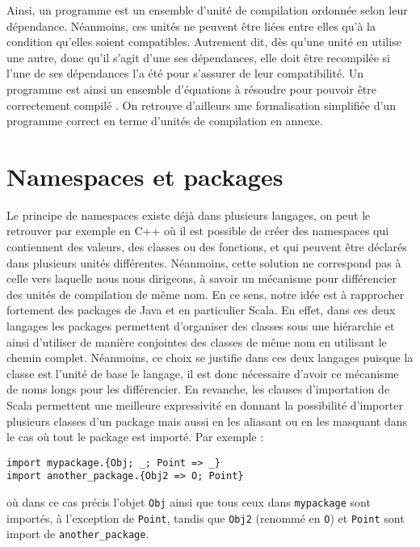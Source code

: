 \documentclass[11pt,a4paper]{report}
\begin{document}
Ainsi, un programme est un ensemble d'unité de compilation ordonnée selon leur
dépendance. Néanmoins, ces unités ne peuvent être liées entre elles qu'à la
condition qu'elles soient compatibles. Autrement dit, dès qu'une unité en
utilise une autre, donc qu'il s'agit d'une ses dépendances, elle doit être
recompilée si l'une de ses dépendances l'a été pour s'assurer de leur
compatibilité. Un programme est ainsi un ensemble d'équations à résoudre
pour pouvoir être correctement compilé \cite{Drossopoulou99afragment}. On
retrouve d'ailleurs une formalisation simplifiée d'un programme correct en terme
d'unités de compilation en annexe.

\section{Namespaces et packages}

Le principe de namespaces existe déjà dans plusieurs langages, on peut le
retrouver par exemple en C++\cite{cppspec} où il est possible de créer des
namespaces qui contiennent des valeurs, des classes ou des fonctions, et qui
peuvent être déclarés dans plusieurs unités différentes. Néanmoins, cette
solution ne correspond pas à celle vers laquelle nous nous dirigeons, à savoir
un mécanisme pour différencier des unités de compilation de même nom. En ce
sens, notre idée est à rapprocher fortement des packages de Java\cite{java-spec}
et en particulier Scala\cite{scalaspec}. En effet, dans ces deux langages les
packages permettent d'organiser des classes sous une hiérarchie et ainsi
d'utiliser de manière conjointes des classes de même nom en utilisant le chemin
complet. Néanmoins, ce choix se justifie dans ces deux langages puisque la 
classe est l'unité de base le langage, il est donc nécessaire d'avoir ce
mécanisme de noms longs pour les différencier. En revanche, les clauses
d'importation de Scala permettent une meilleure expressivité en donnant la
possibilité d'importer plusieurs classes d'un package mais aussi en les aliasant
ou en les masquant dans le cas où tout le package est importé. Par exemple :
\begin{verbatim}
import mypackage.{Obj; _; Point => _}
import another_package.{Obj2 => O; Point}
\end{verbatim}
où dans ce cas précis l'objet \texttt{Obj} ainsi que tous ceux dans
\texttt{mypackage} sont importés, à l'exception de \texttt{Point}, tandis que
\texttt{Obj2} (renommé en \texttt{O}) et \texttt{Point} sont import de
\texttt{another_package}.
\end{document}
